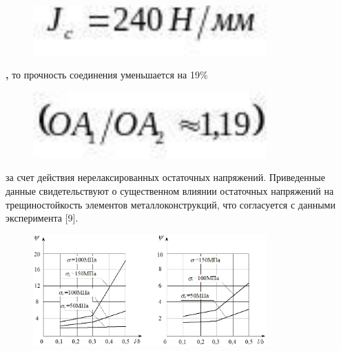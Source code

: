 \begin{figure}[H]
	\centering
	\includegraphics[width=0.8\textwidth]{assets/1235}
	\caption*{}
\end{figure}{\bfseries ,} то прочность соединения
уменьшается на 19\% \begin{figure}[H]
	\centering
	\includegraphics[width=0.8\textwidth]{assets/1236}
	\caption*{}
\end{figure} за счет
действия нерелаксированных остаточных напряжений. Приведенные данные
свидетельствуют о существенном влиянии остаточных напряжений на
трещиностойкость элементов металлоконструкций, что согласуется с данными
эксперимента {[}9{]}.

\begin{figure}[H]
	\centering
	\includegraphics[width=0.8\textwidth]{assets/1237}
	\caption*{}
\end{figure}

